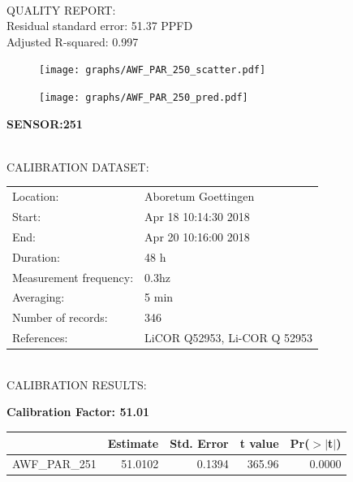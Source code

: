 \documentclass[oneside]{report}
\begin{document}
\hrulefill\\
QUALITY REPORT:\\
Residual standard error: 51.37 PPFD\\
Adjusted R-squared: 0.997



\begin{figure}[H]
  \centering
  \texttt{[image: graphs/AWF\_PAR\_250\_scatter.pdf]}
\end{figure}




\begin{figure}[H]
  \centering
  \texttt{[image: graphs/AWF\_PAR\_250\_pred.pdf]}
\end{figure}

\pagebreak


\begin{center}
\large{\textbf{SENSOR:251}}\\
\end{center}

\hrulefill\\
CALIBRATION DATASET:\\
\begin{table}[h!]
  \centering
  \label{tab:table1}
  \begin{tabular}{ll}
    Location: & Aboretum Goettingen\\ 
    
    
    Start:  & Apr 18 10:14:30 2018 \\
    End:   & Apr 20 10:16:00 2018\\ 
    Duration: & 48 h\\
    Measurement frequency: & 0.3hz\\
    Averaging:  &5 min\\
    Number of records: & 346 \\
    References: & LiCOR Q52953, Li-COR Q 52953 \\
  \end{tabular}
\end{table}

\hrulefill\\
CALIBRATION RESULTS:\\


\begin{center}
\textbf{\large{Calibration Factor: 51.01}}\\
\end{center}
\begin{table}[ht]
\centering
\begin{tabular}{rrrrr}
  \hline
 & Estimate & Std. Error & t value & Pr($>$$|$t$|$) \\ 
  \hline
AWF\_PAR\_251 & 51.0102 & 0.1394 & 365.96 & 0.0000 \\ 
   \hline
\end{tabular}
\end{table}
\end{document}
